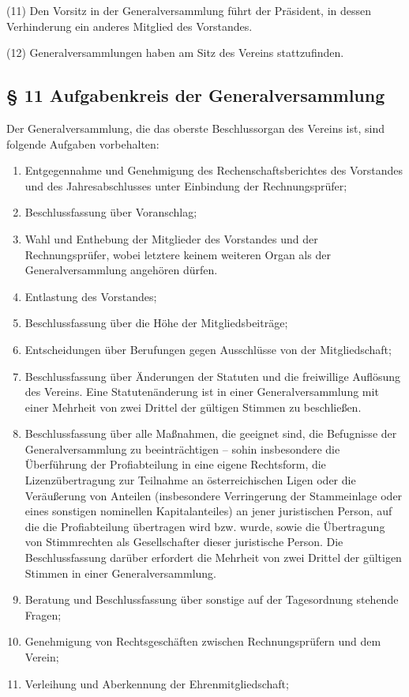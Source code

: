 \documentclass[10pt,a4paper]{article}
\begin{document}
(11)
Den Vorsitz in der Generalversammlung führt der Präsident, in dessen Verhinderung ein anderes Mitglied des Vorstandes.

(12)
Generalversammlungen haben am Sitz des Vereins stattzufinden.

\subsection{§ 11
Aufgabenkreis der Generalversammlung}

Der Generalversammlung, die das oberste Beschlussorgan des Vereins ist, sind folgende Aufgaben vorbehalten:
\begin{enumerate}
\item
Entgegennahme und Genehmigung des Rechenschaftsberichtes des Vorstandes und des Jahresabschlusses unter Einbindung der Rechnungsprüfer;
\item
Beschlussfassung über Voranschlag;
\item
Wahl und Enthebung der Mitglieder des Vorstandes und der Rechnungsprüfer, wobei letztere keinem weiteren Organ als der Generalversammlung angehören dürfen.
\item
Entlastung des Vorstandes;
\item
Beschlussfassung über die Höhe der Mitgliedsbeiträge;
\item
Entscheidungen über Berufungen gegen Ausschlüsse von der Mitgliedschaft;
\item
Beschlussfassung über Änderungen der Statuten und die freiwillige Auflösung des Vereins.
Eine Statutenänderung ist in einer Generalversammlung mit einer Mehrheit von zwei Drittel der gültigen Stimmen zu beschließen.
\item
Beschlussfassung über alle Maßnahmen, die geeignet sind, die Befugnisse der Generalversammlung zu beeinträchtigen – sohin insbesondere die Überführung der Profiabteilung in eine eigene Rechtsform, die Lizenzübertragung zur Teilnahme an österreichischen Ligen oder die Veräußerung von Anteilen (insbesondere Verringerung der Stammeinlage oder eines sonstigen nominellen Kapitalanteiles) an jener juristischen Person, auf die die Profiabteilung übertragen wird bzw. wurde, sowie die Übertragung von Stimmrechten als Gesellschafter dieser juristische Person.
Die Beschlussfassung darüber erfordert die Mehrheit von zwei Drittel der gültigen Stimmen in einer Generalversammlung.
\item
Beratung und Beschlussfassung über sonstige auf der Tagesordnung stehende Fragen;
\item
Genehmigung von Rechtsgeschäften zwischen Rechnungsprüfern und dem Verein;
\item
Verleihung und Aberkennung der Ehrenmitgliedschaft;
\end{enumerate}
\end{document}

